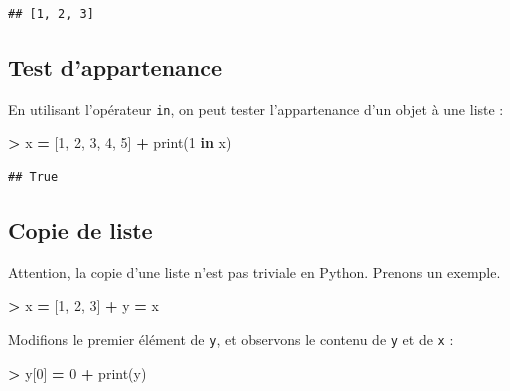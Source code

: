 \documentclass[12pt,]{book}
\newenvironment{Shaded}{\begin{snugshade}}{\end{snugshade}}
\newcommand{\KeywordTok}[1]{\textcolor[rgb]{0.13,0.29,0.53}{\textbf{#1}}}
\newcommand{\DecValTok}[1]{\textcolor[rgb]{0.00,0.00,0.81}{#1}}
\newcommand{\OperatorTok}[1]{\textcolor[rgb]{0.81,0.36,0.00}{\textbf{#1}}}
\newcommand{\BuiltInTok}[1]{#1}
\newcommand{\NormalTok}[1]{#1}
\numberwithin{equation}{section}
\numberwithin{countremarque}{section}
\begin{document}
\begin{lstlisting}
## [1, 2, 3]
\end{lstlisting}

\subsection{Test d'appartenance}\label{test-dappartenance}

En utilisant l'opérateur \texttt{in}, on peut tester l'appartenance d'un
objet à une liste :

\begin{Shaded}
\begin{Highlighting}[]
\OperatorTok{>}\NormalTok{ x }\OperatorTok{=}\NormalTok{ [}\DecValTok{1}\NormalTok{, }\DecValTok{2}\NormalTok{, }\DecValTok{3}\NormalTok{, }\DecValTok{4}\NormalTok{, }\DecValTok{5}\NormalTok{]}
\OperatorTok{+} \BuiltInTok{print}\NormalTok{(}\DecValTok{1} \KeywordTok{in}\NormalTok{ x)}
\end{Highlighting}
\end{Shaded}

\begin{lstlisting}
## True
\end{lstlisting}

\subsection{Copie de liste}\label{copie-de-liste}

Attention, la copie d'une liste n'est pas triviale en Python. Prenons un
exemple.

\begin{Shaded}
\begin{Highlighting}[]
\OperatorTok{>}\NormalTok{ x }\OperatorTok{=}\NormalTok{ [}\DecValTok{1}\NormalTok{, }\DecValTok{2}\NormalTok{, }\DecValTok{3}\NormalTok{]}
\OperatorTok{+}\NormalTok{ y }\OperatorTok{=}\NormalTok{ x}
\end{Highlighting}
\end{Shaded}

Modifions le premier élément de \texttt{y}, et observons le contenu de
\texttt{y} et de \texttt{x} :

\begin{Shaded}
\begin{Highlighting}[]
\OperatorTok{>}\NormalTok{ y[}\DecValTok{0}\NormalTok{] }\OperatorTok{=} \DecValTok{0}
\OperatorTok{+} \BuiltInTok{print}\NormalTok{(y)}
\end{Highlighting}
\end{Shaded}
\end{document}
